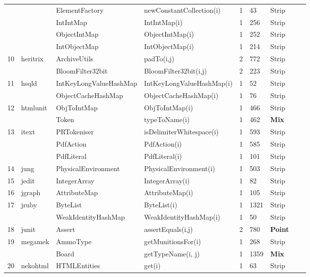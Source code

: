 \documentclass[runningheads,a4paper]{llncs}
\begin{document}
\begin{table}[h]
{\begin{tabular}{|l|l|l|l|l|l|l|l|l|}
	&				& ElementFactory			& newConstantCollection(i)& 1			& 43	& Strip  										 \\ 
	&				& IntIntMap				& IntIntMap(i)			& 1			& 256	& Strip										\\ 
	&				& ObjectIntMap			& ObjectIntMap(i)			& 1			& 252	& Strip 										\\ 
	&				& IntObjectMap			& IntObjectMap(i)			& 1			& 214	& Strip 										\\ 
10	&	heritrix		& ArchiveUtils			& padTo(i,j)				& 2			& 772	& Strip  										\\ 
	&				& BloomFilter32bit 		& BloomFilter32bit(i,j)		& 2	 		& 223	& Strip  										\\ 
11	&	hsqld		& IntKeyLongValueHashMap& IntKeyLongValueHashMap(i)& 1		& 52	& Strip 										\\ 
	&				& ObjectCacheHashMap	& ObjectCacheHashMap(i)	& 1			& 76	& Strip   										\\ 
12	&	htmlunit		& ObjToIntMap			& ObjToIntMap(i)			& 1			& 466	& Strip  										\\ 
	&				& Token					& typeToName(i)			& 1			& 462	& {\bf Mix} 										\\ 
13	&	itext		& PRTokeniser			& isDelimiterWhitespace(i)	& 1			& 593	& Strip  										\\ 
	&				& PdfAction				& PdfAction(i)			& 1			& 585	& Strip  										\\ 
	&				& PdfLiteral				& PdfLiteral(i)			& 1			& 101	& Strip 										\\ 
14	&	jung		& PhysicalEnvironment	& PhysicalEnvironment(i)	& 1			& 503	& Strip 										\\ 
15	&	jedit		& IntegerArray			& IntegerArray(i)			& 1			& 82	& Strip  										\\ 
16	&	jgraph		& AttributeMap			& AttributeMap(i)			& 1			& 105	& Strip										\\ 
17	&	jruby		& ByteList				& ByteList(i)				& 1			& 1321	& Strip 										\\ 
	&				& WeakIdentityHashMap	& WeakIdentityHashMap(i)	& 1			& 50	& Strip 										\\ 
18	&	junit		& Assert					& assertEquals(i,j)		& 2			& 780	& {\bf Point} 										\\ 
19	&	megamek	& AmmoType			& getMunitionsFor(i)		& 1			& 268	& Strip	  									\\ 			
	&				& Board					& getTypeName(i, j)		& 1			& 1359	& {\bf Mix} 										\\ 
20	&	nekohtml	& HTMLEntities			& get(i)					& 1			& 63	& Strip  										\\ 

\end{tabular}}
\end{table}
\end{document}
